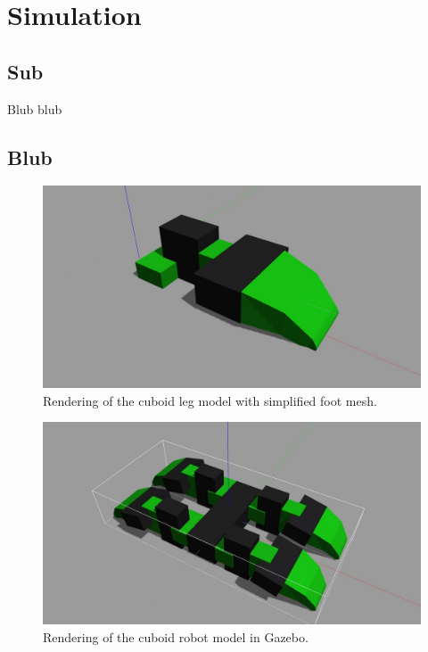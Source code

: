 \graphicspath{{figures/}}


                       
\chapter{Simulation}
\label{chap:simulation}

\section{Sub}

Blub blub

\newpage %
\section{Blub}

\begin{figure}[htb]
    \begin{center}
        \includegraphics[width=0.9\linewidth]{allbot_gazebo_shots/leg_side_top_2.jpg}
        \caption{Rendering of the cuboid leg model with simplified foot mesh.}
        \label{fig:gaz_leg_side_top}
    \end{center}
\end{figure}
\begin{figure}[htb]
    \begin{center}
    \includegraphics[width=0.9\linewidth]{allbot_gazebo_shots/allbot_side_top.jpg}
        \caption{Rendering of the cuboid robot model in Gazebo.}
        \label{fig:gaz_robot_side_top}
    \end{center}
\end{figure}



